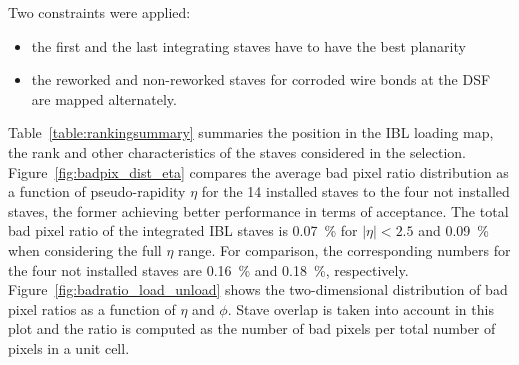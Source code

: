 
Two constraints were applied:
\begin{itemize}
\item the first and the last integrating staves have to have the best planarity
\item the reworked and non-reworked staves for corroded wire bonds at the DSF are mapped alternately.
\end{itemize}

Table~\ref{table:rankingsummary} summaries the position in the IBL loading map, the rank and other characteristics of the staves considered in the selection. Figure~\ref{fig:badpix_dist_eta} compares the average bad pixel ratio distribution as a function of pseudo-rapidity $\eta$ for the 14 installed staves to the four not installed staves, the former achieving better performance in terms of acceptance. The total bad pixel ratio of the integrated IBL staves is \SI{0.07}{\percent} for $|\eta|<2.5$ and \SI{0.09}{\percent} when considering the full $\eta$ range. For comparison, the corresponding numbers for the four not installed staves are \SI{0.16}{\percent} and \SI{0.18}{\percent}, respectively. Figure~\ref{fig:badratio_load_unload} shows the two-dimensional distribution of bad pixel ratios as a function of $\eta$ and $\phi$. Stave overlap is taken into account in this plot and the ratio is computed as the number of bad pixels per total number of pixels in a unit cell.

